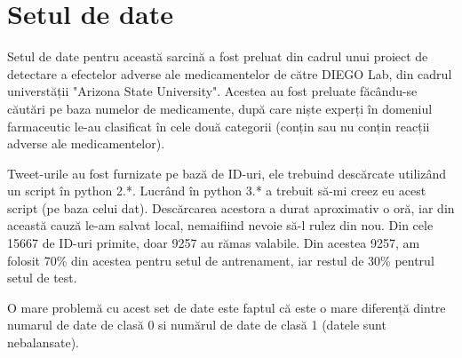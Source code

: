 \chapter{Setul de date}

Setul de date pentru această sarcină a fost preluat din cadrul unui
proiect de detectare a efectelor adverse ale medicamentelor de către
DIEGO Lab, din cadrul universtății "Arizona State University". Acestea
au fost preluate făcându-se căutări pe baza numelor de medicamente, după 
care niște experți în domeniul farmaceutic le-au clasificat în cele două
categorii (conțin sau nu conțin reacții adverse ale medicamentelor).

Tweet-urile au fost furnizate pe bază de ID-uri, ele trebuind descărcate
utilizând un script în python 2.*. Lucrând în python 3.* a trebuit să-mi
creez eu acest script (pe baza celui dat). Descărcarea acestora a durat
aproximativ o oră, iar din această cauză le-am salvat local, nemaifiind
nevoie să-l rulez din nou. Din cele 15667 de ID-uri primite, doar 9257 au rămas valabile.
Din acestea 9257, am folosit 70\% din acestea pentru setul de antrenament, iar restul
de 30\% pentrul setul de test.

O mare problemă cu acest set de date este faptul că este o mare diferență dintre
numarul de date de clasă 0 si numărul de date de clasă 1 (datele sunt nebalansate).

